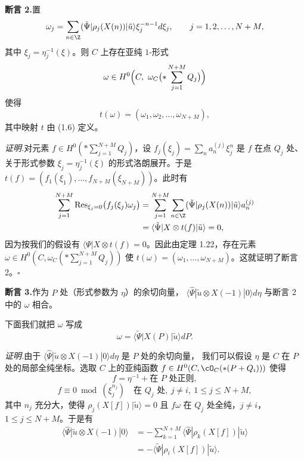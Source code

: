 \noindent\textbf{断言 2.}\quad 置
\[
  \omega_j = \sum_{n\in\Z}(\tilde{\Psi}|\rho_j(X(n))|\tilde{u}\rangle
  \xi_j^{-n-1}d\xi_j,\qquad j=1,2,\dots,N+M,
\]
其中 $\xi_j=\eta_j^{-1}(\xi)$。则 $C$ 上存在亚纯 $1$-形式
\[
  \omega\in H^0\Bigl(C,\ \omega_C\bigl(*\sum_{j=1}^{N+M}Q_j\bigr)\Bigr)
\]
使得
\[
  t(\omega) = (\omega_1,\omega_2,\dots,\omega_{N+M}),
\]
其中映射 $t$ 由 (1.6) 定义。

\noindent\textit{证明.}\quad 对元素 $f\in H^0(*\sum_{j=1}^{N+M}Q_j)$，设
$f_j(\xi_j)=\sum_n a_n^{(j)}\xi_j^n$ 是 $f$ 在点 $Q_j$ 处、关于形式参数
$\xi_j=\eta_j^{-1}(\xi)$ 的形式洛朗展开。于是
$t(f)=(f_1(\xi_1),\dots,f_{N+M}(\xi_{N+M}))$。此时有
\[
  \begin{aligned}
  \sum_{j=1}^{N+M}\operatorname{Res}_{\xi_j=0}\bigl(f_j(\xi_j)\omega_j\bigr)
  &= \sum_{j=1}^{N+M}\sum_{n\in\Z}
     (\tilde{\Psi}|\rho_j(X(n))|\tilde{u}\rangle a_n^{(j)}\\
  &= \langle\tilde{\Psi}|X\otimes t(f)|\tilde{u}\rangle = 0,
  \end{aligned}
\]
因为按我们的假设有 $\langle\Psi|X\otimes t(f)=0$。因此由定理 1.22，存在元素
$\omega\in H^0(C,\omega_C(*\sum_{j=1}^{N+M}Q_j))$ 使
$t(\omega)=(\omega_1,\dots,\omega_{N+M})$。这就证明了断言 2。\hfill$\square$
%

\noindent\textbf{断言 3.}\quad 作为 $P$ 处（形式参数为 $\eta$）的余切向量，
$\langle\hat{\Psi}|\tilde{u}\otimes X(-1)|0\rangle d\eta$ 与断言 2 中的 $\omega$ 相合。

下面我们就把 $\omega$ 写成
\[
  \omega = \langle\tilde{\Psi}|X(P)|\tilde{u}\rangle dP .
\]

\noindent\textit{证明.}\quad 由于
$\langle\hat{\Psi}|\tilde{u}\otimes X(-1)|0\rangle d\eta$ 是 $P$ 处的余切向量，
我们可以假设 $\eta$ 是 $C$ 在 $P$ 处的局部全纯坐标。选取 $C$ 上的亚纯函数
$f\in H^0(C,\cO_C(*(P+Q_i)))$ 使得
\[
  f = \eta^{-1} + \text{在 } P \text{ 处正则},
\]
\[
  f\equiv 0 \bmod(\xi_j^{n_j}) \quad \text{在 } Q_j \text{ 处},\
  j\ne i,\ 1\le j\le N+M,
\]
其中 $n_j$ 充分大，使得 $\rho_j(X[f])|\tilde{u}\rangle=0$ 且 $f\omega$ 在 $Q_j$
处全纯，$j\ne i$，$1\le j\le N+M$。于是有
\[
  \begin{aligned}
  \langle\hat{\Psi}|\tilde{u}\otimes X(-1)|0\rangle
  &= -\sum_{k=1}^{N+M}\langle\hat{\Psi}|\rho_k(X[f])|\tilde{u}\rangle\\
  &= -\langle\tilde{\Psi}|\rho_i(X[f])|\tilde{u}\rangle .
  \end{aligned}
\]


